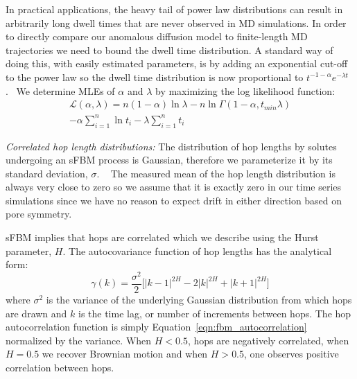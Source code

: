 \documentclass[journal=ancac3,manuscript=article,layout=twocolumn]{achemso}
\begin{document}
  In practical applications, the heavy tail of power law distributions can result in 
  arbitrarily long dwell times that are never observed in MD simulations. 
  In order to directly compare our anomalous diffusion model to finite-length MD 
  trajectories we need to bound the dwell time distribution. A standard way of 
  doing this, with easily estimated parameters, is by adding an exponential 
  cut-off to the power law so the dwell time distribution is now proportional 
  to $t^{-1 - \alpha}e^{-\lambda t}$.~\cite{newman_power_2005,clauset_power-law_2009}  %
  We determine MLEs of $\alpha$ and $\lambda$ by maximizing the log 
  likelihood function:~\cite{clauset_power-law_2009}
  \begin{equation}
  	\begin{split}
    \mathcal{L}(\alpha, \lambda) = n(1 - \alpha)\ln\lambda - n\ln\Gamma(1 - \alpha, t_{min}\lambda) \\
    -\alpha\sum_{i=1}^{n}\ln t_i - \lambda\sum_{i=1}^n t_i
    \end{split}
  \label{eqn:powerlaw_cutoff_likelihood}
  \end{equation}
  
  \textit{Correlated hop length distributions:} The distribution of hop 
  lengths by solutes undergoing an sFBM process is Gaussian, therefore we 
  parameterize it by its standard deviation, $\sigma$.
  ~\cite{metzler_random_2000, metzler_anomalous_2014,neusius_subdiffusion_2009}
  The measured mean of the hop length distribution is always very close to zero so
  we assume that it is exactly zero in our time series simulations since we have 
  no reason to expect drift in either direction based on pore symmetry.

  sFBM implies that hops are correlated which we describe using the Hurst
  parameter, $H$. The autocovariance function of hop lengths has the
  analytical form:~\cite{mandelbrot_fractional_1968}
  \begin{equation}
    \gamma(k) = \dfrac{\sigma^2}{2}\bigg[|k-1|^{2H} - 2|k|^{2H} + |k+1|^{2H}\bigg]
  \label{eqn:fbm_autocorrelation}
  \end{equation}
  where $\sigma^2$ is the variance of the underlying Gaussian distribution from
  which hops are drawn and $k$ is the time lag, or number of increments between
  hops. The hop autocorrelation function is simply
  Equation~\ref{eqn:fbm_autocorrelation} normalized by the variance.  When $H <
  0.5$, hops are negatively correlated, when $H = 0.5$ we recover Brownian
  motion and when $H > 0.5$, one observes positive correlation between hops. 
 
\end{document}
